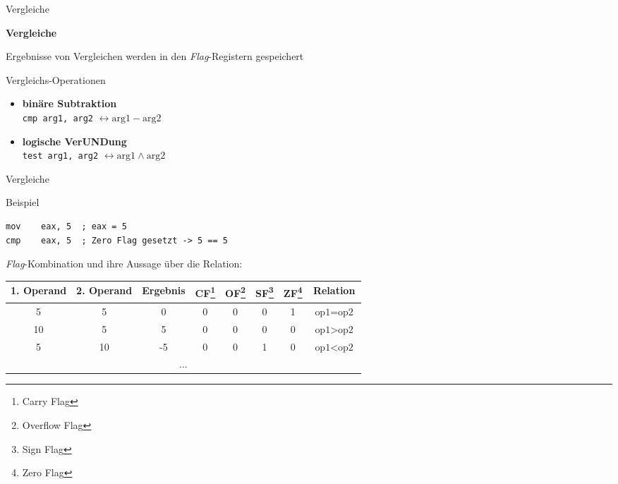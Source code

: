 \begin{frame}{Vergleiche}

\begin{center}
\textbf{Vergleiche}
\end{center}

Ergebnisse von Vergleichen werden in den \textit{Flag}-Registern gespeichert

\makebox{}

Vergleichs-Operationen
\begin{itemize}
    \item \textbf{binäre Subtraktion}\\
        \texttt{cmp arg1, arg2} $\leftrightarrow \text{arg1} - \text{arg2}$

    \item \textbf{logische VerUNDung}\\
        \texttt{test arg1, arg2} $\leftrightarrow \text{arg1} \wedge \text{arg2}$
\end{itemize}
\end{frame}

\begin{frame}[fragile]{Vergleiche}

Beispiel
\begin{lstlisting}
mov    eax, 5  ; eax = 5
cmp    eax, 5  ; Zero Flag gesetzt -> 5 == 5
\end{lstlisting}

\makebox{}

\textit{Flag}-Kombination und ihre Aussage über die Relation:

\makebox{}

\begin{small}
\begin{tabular}{|c|c|c|c|c|c|c|c|}
\hline
1. Operand & 2. Operand & Ergebnis &
CF\footnote{Carry Flag} &
OF\footnote{Overflow Flag} &
SF\footnote{Sign Flag} &
ZF\footnote{Zero Flag}
& Relation \\ \hline
5          & 5          & 0        & 0  & 0  & 0  & 1  & $\text{op1} = \text{op2}$ \\ \hline
10         & 5          & 5        & 0  & 0  & 0  & 0  & $\text{op1} > \text{op2}$ \\ \hline
5          & 10         & -5       & 0  & 0  & 1  & 0  & $\text{op1} < \text{op2}$ \\ \hline
\multicolumn{8}{|c|}{...} \\ \hline
\end{tabular}
\end{small}

\end{frame}

